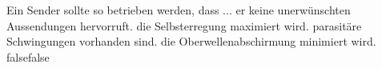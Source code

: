     {Ein Sender sollte so betrieben werden, dass ...}
    {er keine unerwünschten Aussendungen hervorruft.}
    {die Selbsterregung maximiert wird.}
    {parasitäre Schwingungen vorhanden sind.}
    {die Oberwellenabschirmung minimiert wird.}
    {false}{false}